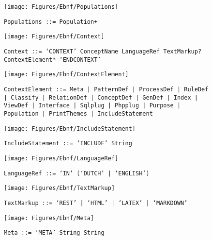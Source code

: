  \begin{figure}[H]
  \centering
  \texttt{[image: Figures/Ebnf/Populations]}
  \caption*{\texttt{Populations \small::=  Population+}}
  \label{fig:ebnf-Populations}
 \end{figure}

 \begin{figure}[H]
  \centering
  \texttt{[image: Figures/Ebnf/Context]}
  \caption*{\texttt{Context \small::=  `CONTEXT' ConceptName LanguageRef TextMarkup? ContextElement* `ENDCONTEXT'}}
  \label{fig:ebnf-Context}
 \end{figure}

 \begin{figure}[H]
  \centering
  \texttt{[image: Figures/Ebnf/ContextElement]}
  \caption*{\texttt{ContextElement \small::=  Meta | PatternDef | ProcessDef | RuleDef | Classify | RelationDef | ConceptDef | GenDef | Index | ViewDef | Interface | Sqlplug | Phpplug | Purpose | Population | PrintThemes | IncludeStatement}}
  \label{fig:ebnf-ContextElement}
 \end{figure}

 \begin{figure}[H]
  \centering
  \texttt{[image: Figures/Ebnf/IncludeStatement]}
  \caption*{\texttt{IncludeStatement \small::=  `INCLUDE' String}}
  \label{fig:ebnf-IncludeStatement}
 \end{figure}

 \begin{figure}[H]
  \centering
  \texttt{[image: Figures/Ebnf/LanguageRef]}
  \caption*{\texttt{LanguageRef \small::=  `IN' (`DUTCH' | `ENGLISH')}}
  \label{fig:ebnf-LanguageRef}
 \end{figure}

 \begin{figure}[H]
  \centering
  \texttt{[image: Figures/Ebnf/TextMarkup]}
  \caption*{\texttt{TextMarkup \small::=  `REST' | `HTML' | `LATEX' | `MARKDOWN'}}
  \label{fig:ebnf-TextMarkup}
 \end{figure}

 \begin{figure}[H]
  \centering
  \texttt{[image: Figures/Ebnf/Meta]}
  \caption*{\texttt{Meta \small::=  `META' String String}}
  \label{fig:ebnf-Meta}
 \end{figure}

